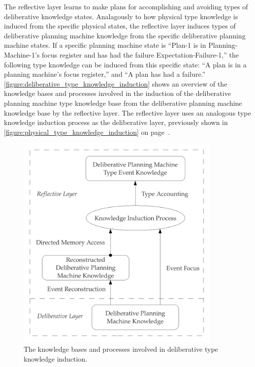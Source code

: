 The reflective layer learns to make plans for accomplishing and
avoiding types of deliberative knowledge states.  Analagously to how
physical type knowledge is induced from the specific physical states,
the reflective layer induces types of deliberative planning machine
knowledge from the specific deliberative planning machine states.  If
a specific planning machine state is ``Plan-1 is in
Planning-Machine-1's focus register and has had the failure
Expectation-Failure-1,'' the following type knowledge can be induced
from this specific state: ``A plan is in a planning machine's focus
register,'' and ``A plan has had a failure.''
{\mbox{\autoref{figure:deliberative_type_knowledge_induction}}} shows
an overview of the knowledge bases and processes involved in the
induction of the deliberative planning machine type knowledge base
from the deliberative planning machine knowledge base by the
reflective layer.  The reflective layer uses an analogous type
knowledge induction process as the deliberative layer, previously
shown in {\mbox{\autoref{figure:physical_type_knowledge_induction}}}
on {\mbox{page~\pageref{figure:physical_type_knowledge_induction}}}.
\begin{figure}[h]
\centering
\includegraphics[width=10cm]{gfx/deliberative_type_knowledge_induction}
\caption[The knowledge bases and processes involved in deliberative
  type knowledge induction.]{The knowledge bases and processes
  involved in deliberative type knowledge induction.}
\label{figure:deliberative_type_knowledge_induction}
\end{figure}


